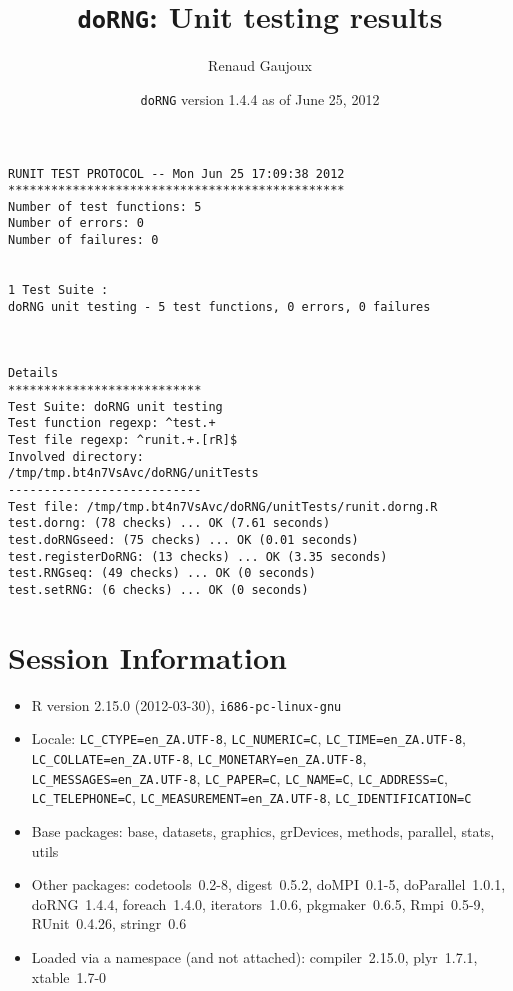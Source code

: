 \documentclass[10pt]{article}
\author{Renaud Gaujoux}
\title{\texttt{doRNG}: Unit testing results}
\date{\texttt{doRNG} version 1.4.4 as of June 25, 2012}
\begin{document}
\maketitle

\begin{verbatim}
RUNIT TEST PROTOCOL -- Mon Jun 25 17:09:38 2012 
*********************************************** 
Number of test functions: 5 
Number of errors: 0 
Number of failures: 0 

 
1 Test Suite : 
doRNG unit testing - 5 test functions, 0 errors, 0 failures



Details 
*************************** 
Test Suite: doRNG unit testing 
Test function regexp: ^test.+ 
Test file regexp: ^runit.+.[rR]$ 
Involved directory: 
/tmp/tmp.bt4n7VsAvc/doRNG/unitTests 
--------------------------- 
Test file: /tmp/tmp.bt4n7VsAvc/doRNG/unitTests/runit.dorng.R 
test.dorng: (78 checks) ... OK (7.61 seconds)
test.doRNGseed: (75 checks) ... OK (0.01 seconds)
test.registerDoRNG: (13 checks) ... OK (3.35 seconds)
test.RNGseq: (49 checks) ... OK (0 seconds)
test.setRNG: (6 checks) ... OK (0 seconds)
\end{verbatim}

\section*{Session Information}
\begin{itemize}\raggedright
  \item R version 2.15.0 (2012-03-30), \verb|i686-pc-linux-gnu|
  \item Locale: \verb|LC_CTYPE=en_ZA.UTF-8|, \verb|LC_NUMERIC=C|, \verb|LC_TIME=en_ZA.UTF-8|, \verb|LC_COLLATE=en_ZA.UTF-8|, \verb|LC_MONETARY=en_ZA.UTF-8|, \verb|LC_MESSAGES=en_ZA.UTF-8|, \verb|LC_PAPER=C|, \verb|LC_NAME=C|, \verb|LC_ADDRESS=C|, \verb|LC_TELEPHONE=C|, \verb|LC_MEASUREMENT=en_ZA.UTF-8|, \verb|LC_IDENTIFICATION=C|
  \item Base packages: base, datasets, graphics, grDevices, methods,
    parallel, stats, utils
  \item Other packages: codetools~0.2-8, digest~0.5.2, doMPI~0.1-5,
    doParallel~1.0.1, doRNG~1.4.4, foreach~1.4.0, iterators~1.0.6,
    pkgmaker~0.6.5, Rmpi~0.5-9, RUnit~0.4.26, stringr~0.6
  \item Loaded via a namespace (and not attached): compiler~2.15.0,
    plyr~1.7.1, xtable~1.7-0
\end{itemize}
\end{document}
